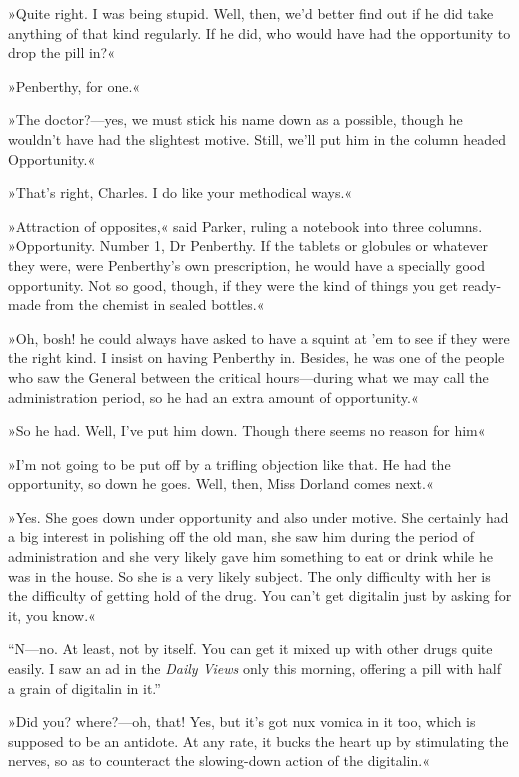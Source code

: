 »Quite right. I was being stupid. Well, then, we'd better find out if he did take anything of that kind regularly. If he did, who would have had the opportunity to drop the pill in?«

»Penberthy, for one.«

»The doctor?---yes, we must stick his name down as a possible, though he wouldn't have had the slightest motive. Still, we'll put him in the column headed Opportunity.«

»That's right, Charles. I do like your methodical ways.«

»Attraction of opposites,« said Parker, ruling a notebook into three columns. »Opportunity. Number 1, Dr Penberthy. If the tablets or globules or whatever they were, were Penberthy's own prescription, he would have a specially good opportunity. Not so good, though, if they were the kind of things you get ready-made from the chemist in sealed bottles.«

»Oh, bosh! he could always have asked to have a squint at 'em to see if they were the right kind. I insist on having Penberthy in. Besides, he was one of the people who saw the General between the critical hours\allowbreak---\allowbreak during what we may call the administration period, so he had an extra amount of opportunity.«

»So he had. Well, I've put him down. Though there seems no reason for him\longdash«

»I'm not going to be put off by a trifling objection like that. He had the opportunity, so down he goes. Well, then, Miss Dorland comes next.«

»Yes. She goes down under opportunity and also under motive. She certainly had a big interest in polishing off the old man, she saw him during the period of administration and she very likely gave him something to eat or drink while he was in the house. So she is a very likely subject. The only difficulty with her is the difficulty of getting hold of the drug. You can't get digitalin just by asking for it, you know.«

\enquote{N\allowbreak---\allowbreak no. At least, not by itself. You can get it mixed up with other drugs quite easily. I saw an ad in the \textit{Daily Views} only this morning, offering a pill with half a grain of digitalin in it.}

»Did you? where?---oh, that! Yes, but it's got nux vomica in it too, which is supposed to be an antidote. At any rate, it bucks the heart up by stimulating the nerves, so as to counteract the slowing-down action of the digitalin.«

